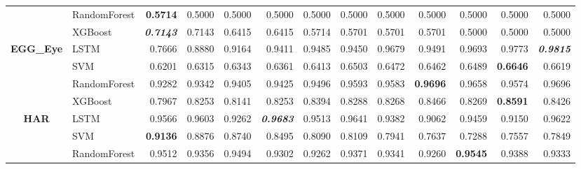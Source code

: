 \begin{table}[H]
\begin{adjustbox}{max width=12cm}
\begin{tabular}{|c|l|r|r|r|r|r|r|r|r|r|r|r|}
			                      & RandomForest & \textbf{0.5714}          & 0.5000          & 0.5000          & 0.5000                   & 0.5000 & 0.5000          & 0.5000 & 0.5000          & 0.5000                   & 0.5000          & 0.5000                   \\
			                      & XGBoost      & \textit{\textbf{0.7143}} & 0.7143          & 0.6415          & 0.6415                   & 0.5714 & 0.5701          & 0.5701 & 0.5701          & 0.5000                   & 0.5000          & 0.5000                   \\
			\hline
			\textbf{EGG\_Eye}     & LSTM         & 0.7666                   & 0.8880          & 0.9164          & 0.9411                   & 0.9485 & 0.9450          & 0.9679 & 0.9491          & 0.9693                   & 0.9773          & \textit{\textbf{0.9815}} \\
			                      & SVM          & 0.6201                   & 0.6315          & 0.6343          & 0.6361                   & 0.6413 & 0.6503          & 0.6472 & 0.6462          & 0.6489                   & \textbf{0.6646} & 0.6619                   \\
			                      & RandomForest & 0.9282                   & 0.9342          & 0.9405          & 0.9425                   & 0.9496 & 0.9593          & 0.9583 & \textbf{0.9696} & 0.9658                   & 0.9574          & 0.9696                   \\
			                      & XGBoost      & 0.7967                   & 0.8253          & 0.8141          & 0.8253                   & 0.8394 & 0.8288          & 0.8268 & 0.8466          & 0.8269                   & \textbf{0.8591} & 0.8426                   \\
			\hline
			\textbf{HAR}          & LSTM         & 0.9566                   & 0.9603          & 0.9262          & \textit{\textbf{0.9683}} & 0.9513 & 0.9641          & 0.9382 & 0.9062          & 0.9459                   & 0.9150          & 0.9622                   \\
			                      & SVM          & \textbf{0.9136}          & 0.8876          & 0.8740          & 0.8495                   & 0.8090 & 0.8109          & 0.7941 & 0.7637          & 0.7288                   & 0.7557          & 0.7849                   \\
			                      & RandomForest & 0.9512                   & 0.9356          & 0.9494          & 0.9302                   & 0.9262 & 0.9371          & 0.9341 & 0.9260          & \textbf{0.9545}          & 0.9388          & 0.9333                   \\

\end{tabular}
\end{adjustbox}
\end{table}
